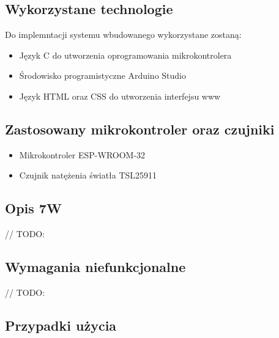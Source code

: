 \documentclass[12pt,a4paper]{article}
\begin{document}
\subsection{Wykorzystane technologie}
Do implemntacji systemu wbudowanego wykorzystane zostaną:
\begin{itemize}
    \item Język C do utworzenia oprogramowania mikrokontrolera
    \item Środowisko programistyczne Arduino Studio
    \item Język HTML oraz CSS do utworzenia interfejsu www
\end{itemize}

\subsection{Zastosowany mikrokontroler oraz czujniki}

\begin{itemize}
    \item Mikrokontroler ESP-WROOM-32
    \item Czujnik natężenia światła TSL25911
\end{itemize}

\subsection{Opis 7W}

// TODO: 

\subsection{Wymagania niefunkcjonalne}

// TODO: 

\subsection{Przypadki użycia}
\end{document}
